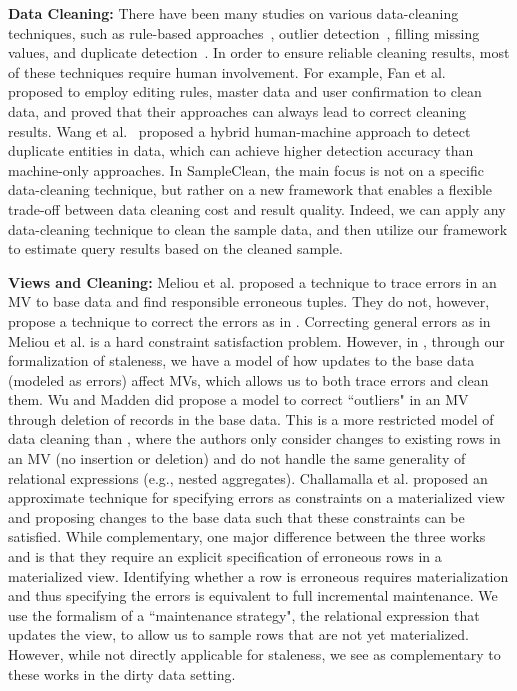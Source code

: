 {\noindent \bf Data Cleaning:} There have been many studies on various data-cleaning techniques, such as rule-based approaches~\cite{fan2012foundations,DBLP:conf/sigmod/DallachiesaEEEIOT13}, outlier detection~\cite{hellerstein2008quantitative,dasu2003exploratory}, filling missing values, and duplicate detection~\cite{conf/hdkm/Christen08, DBLP:conf/kdd/BilenkoM03, conf/sigmod/WangLF12}. In order to ensure reliable cleaning results, most of these techniques require human involvement.
For example, Fan et al.~\cite{DBLP:journals/pvldb/FanLMTY10} proposed to employ editing rules, master data and user confirmation to clean data, and proved that their approaches can always lead to correct cleaning results. Wang et al.~\cite{DBLP:journals/pvldb/WangKFF12} proposed a hybrid human-machine approach to detect duplicate entities in data, which can achieve higher detection accuracy than machine-only approaches. 
In SampleClean, the main focus is not on a specific data-cleaning technique, but rather on a new framework that enables a flexible trade-off between data cleaning cost and result quality.
Indeed, we can apply any data-cleaning technique to clean the sample data, and then utilize our framework to estimate query results based on the cleaned sample. 

\vspace{.5em}

{\noindent \bf Views and Cleaning:} Meliou et al. \cite{DBLP:conf/sigmod/MeliouGNS11} proposed a technique to trace errors in an MV to base data and find responsible erroneous tuples. 
They do not, however, propose a technique to correct the errors as in \svc.
Correcting general errors as in Meliou et al. is a hard constraint satisfaction problem.
However, in \svc, through our formalization of staleness, we have a model of how updates to the base data (modeled as errors) affect MVs, which allows us to both trace errors and clean them.
Wu and Madden \cite{DBLP:journals/pvldb/0002M13} did propose a model to correct ``outliers" in an MV through deletion of records in the base data.
This is a more restricted model of data cleaning than \svc, where the authors only consider changes to existing rows in an MV (no insertion or deletion) and do not handle the same generality of relational expressions (e.g., nested aggregates).
Challamalla et al. \cite{DBLP:conf/sigmod/ChalamallaIOP14} proposed an approximate technique for specifying errors as constraints on a materialized view and proposing changes to the base data such that these constraints can be satisfied.
While complementary, one major difference between the three works \cite{DBLP:conf/sigmod/MeliouGNS11, DBLP:journals/pvldb/0002M13, DBLP:conf/sigmod/ChalamallaIOP14} and \svc is that they require an explicit specification of erroneous rows in a materialized view.
Identifying whether a row is erroneous requires materialization and thus specifying the errors is equivalent to full incremental maintenance. 
We use the formalism of a ``maintenance strategy", the relational expression that updates the view, to allow us to sample rows that are not yet materialized.
However, while not directly applicable for staleness, we see \svc as complementary to these works in the dirty data setting. 
